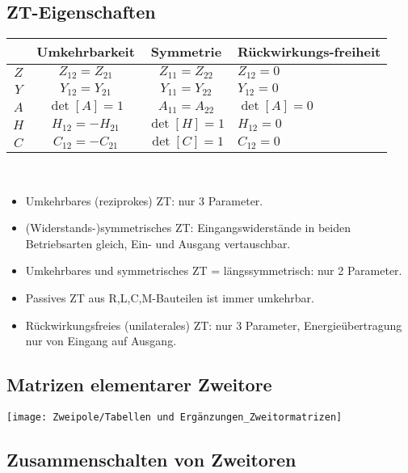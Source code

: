 \subsection{ZT-Eigenschaften}
\small
\begin{tabularx}{0.85\columnwidth}{|c|c|c|X|}
	\hline
	& Umkehrbarkeit & Symmetrie & Rückwirkungs-freiheit\\
	\hline\hline
	$Z$&  $Z_{12} = Z_{21}$ & $Z_{11} = Z_{22}$ & $Z_{12} = 0$\\
	\hline
	$Y$&  $Y_{12} = Y_{21}$& $Y_{11} = Y_{22}$ & $Y_{12 } = 0$ \\
	\hline
	$A$&  $\operatorname{det}[A] = 1$& $A_{11} = A_{22}$ & $\operatorname{det}[A] = 0$\\
	\hline
	$H$&  $H_{12} = -H_{21}$& $\operatorname{det}[H]=1$ & $H_{12} = 0$ \\
	\hline
	$C$&  $C_{12} = -C_{21}$& $\operatorname{det}[C]=1$ & $C_{12} = 0$ \\
		\hline
\end{tabularx}\\
\begin{itemize}[leftmargin=*]
	\item Umkehrbares (reziprokes) ZT: nur 3 Parameter.
	\item (Widerstands-)symmetrisches ZT: Eingangswiderstände in beiden Betriebsarten gleich, Ein- und Ausgang vertauschbar.
	\item Umkehrbares und symmetrisches ZT = längssymmetrisch: nur 2 Parameter.
	\item Passives ZT aus R,L,C,M-Bauteilen ist immer umkehrbar.
	\item Rückwirkungsfreies (unilaterales) ZT: nur 3 Parameter, Energieübertragung nur von Eingang auf Ausgang.
\end{itemize}
\clearpage
\begin{samepage}
    \subsection{Matrizen elementarer Zweitore}
    \begin{center}
    	\texttt{[image: Zweipole/Tabellen und Ergänzungen\_Zweitormatrizen]}
    \end{center}
\end{samepage}
\clearpage

\subsection{Zusammenschalten von Zweitoren}
